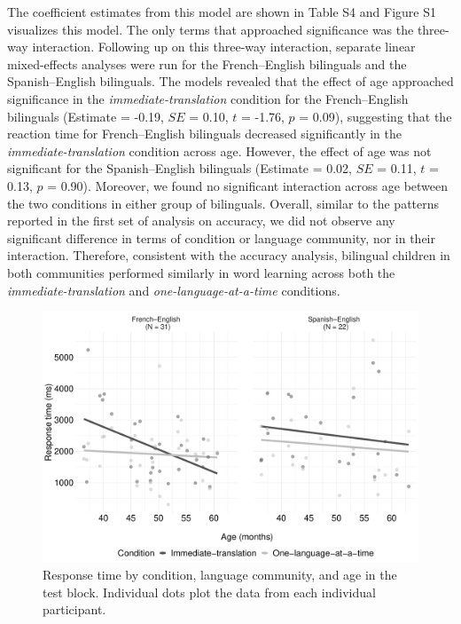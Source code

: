 \documentclass[
  man,floatsintext]{apa7}
\begin{document}
\noindent The coefficient estimates from this model are shown in Table S4 and Figure S1 visualizes this model. The only terms that approached significance was the three-way interaction. Following up on this three-way interaction, separate linear mixed-effects analyses were run for the French--English bilinguals and the Spanish--English bilinguals. The models revealed that the effect of age approached significance in the \emph{immediate-translation} condition for the French--English bilinguals (Estimate = -0.19, \(SE\) = 0.10, \(t\) = -1.76, \(p\) = 0.09), suggesting that the reaction time for French--English bilinguals decreased significantly in the \emph{immediate-translation} condition across age. However, the effect of age was not significant for the Spanish--English bilinguals (Estimate = 0.02, \(SE\) = 0.11, \(t\) = 0.13, \(p\) = 0.90). Moreover, we found no significant interaction across age between the two conditions in either group of bilinguals. Overall, similar to the patterns reported in the first set of analysis on accuracy, we did not observe any significant difference in terms of condition or language community, nor in their interaction. Therefore, consistent with the accuracy analysis, bilingual children in both communities performed similarly in word learning across both the \emph{immediate-translation} and \emph{one-language-at-a-time} conditions.

\begin{figure}

{\centering \includegraphics[width=0.9\linewidth]{TabletSwitch_supplemental_files/figure-latex/FigureS1-1} 

}

\caption{Response time by condition, language community, and age in the test block. Individual dots plot the data from each individual participant.}\label{fig:FigureS1}
\end{figure}
\end{document}
